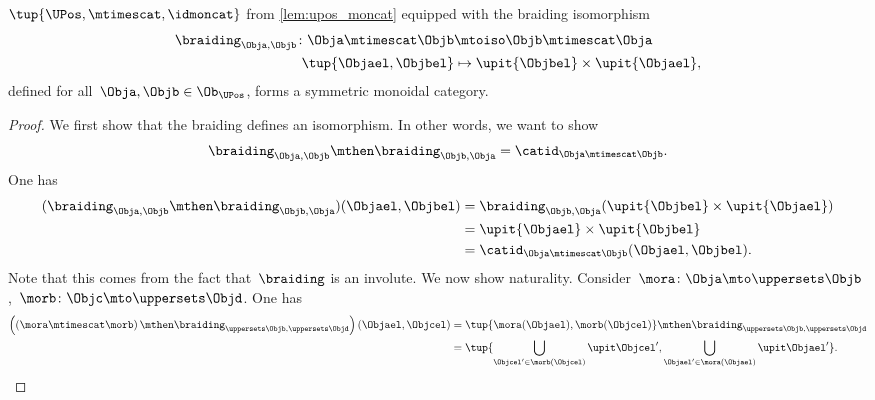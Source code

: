 \begin{lemma}
    \label{lem:UPos-is-sym-mon}
    $\tup{\UPos,\mtimescat,\idmoncat}$ from \cref{lem:upos_moncat} equipped with the braiding isomorphism
    \begin{equation}
        \label{eq:Upos-braiding}
        \begin{aligned}
        \braiding_{\Obja,\Objb}\colon \Obja \mtimescat \Objb &\mtoiso \Objb \mtimescat \Obja\\
            \tup{\Objael,\Objbel}&\mapsto \upit\{\Objbel\} \times \upit\{\Objael\},
        \end{aligned}
    \end{equation}
    defined for all~$\Obja,\Objb\in \Ob_{\UPos}$, forms a symmetric monoidal category.
\end{lemma}
\begin{proof}
We first show that the braiding defines an isomorphism.
In other words, we want to show
\begin{equation*}
    \braiding_{\Obja,\Objb}\mthen \braiding_{\Objb,\Obja}=\catid_{\Obja \mtimescat \Objb}.
\end{equation*}
One has
    \begin{equation*}
        \begin{aligned}
            (\braiding_{\Obja,\Objb}\mthen \braiding_{\Objb,\Obja})(\Objael,\Objbel)&=\braiding_{\Objb,\Obja}(\upit\{\Objbel\} \times \upit\{\Objael\})\\
            &=\upit\{\Objael\} \times \upit\{\Objbel\}\\
            &=\catid_{\Obja\mtimescat \Objb}(\Objael,\Objbel).
        \end{aligned}
    \end{equation*}
Note that this comes from the fact that~$\braiding$ is an involute.
We now show naturality. Consider~$\mora \colon \Obja \mto \uppersets \Objb$,~$\morb\colon \Objc \mto \uppersets \Objd$.
One has
    \begin{equation}
        \label{eq:braid-upos-natural-a}
    \begin{aligned}
        \left(\left( \mora \mtimescat \morb\right)\mthen \braiding_{\uppersets \Objb, \uppersets \Objd}\right)(\Objael,\Objcel)&=
        \tup{\mora(\Objael),\morb(\Objcel)}\mthen \braiding_{\uppersets \Objb, \uppersets \Objd}\\
        &=\tup{\bigcup_{\Objcel'\in \morb(\Objcel)}\upit \Objcel',\bigcup_{\Objael'\in \mora(\Objael)}\upit \Objael'}.
    \end{aligned}
    \end{equation}

\end{proof}

